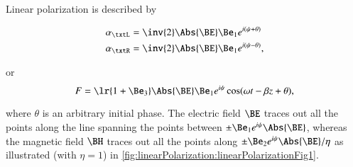 

Linear polarization is described by

\begin{dmath}\label{eqn:polarization_linearPolarization:280}
\begin{aligned}
\alpha_\txtL &= \inv{2}\Abs{\BE} \Be_1 e^{i(\psi + \theta)} \\
\alpha_\txtR &= \inv{2}\Abs{\BE} \Be_1 e^{i(\psi - \theta)},
\end{aligned}
\end{dmath}

or
\begin{dmath}\label{eqn:polarization_linearPolarization:300}
F = \lr{ 1 + \Be_3 } \Abs{\BE} \Be_1 e^{i\psi} \cos( \omega t - \beta z + \theta ),
\end{dmath}

where \( \theta \) is an arbitrary initial phase.  The electric field \( \BE \) traces out all the points along the line spanning the points between \( \pm \Be_1 e^{i\psi} \Abs{\BE} \), whereas the magnetic field \( \BH \) traces
out all the points along \( \pm \Be_2 e^{i\psi} \Abs{\BE}/\eta \) as illustrated (with \( \eta = 1 \)) in
\cref{fig:linearPolarization:linearPolarizationFig1}.

